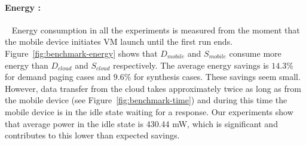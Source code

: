 \paragraph{Energy :}~
Energy consumption in all the experiments is measured from the moment
that the mobile device initiates VM launch until the first run ends.
Figure~\ref{fig:benchmark-energy} shows that $D_{mobile}$ and
$S_{mobile}$ consume more energy than $D_{cloud}$ and $S_{cloud}$
respectively. The average energy savings is $14.3\%$ for demand paging
cases and $9.6\%$ for synthesis cases. These savings seem
small. However, data transfer from the cloud takes approximately twice
as long as from the mobile device (see
Figure~\ref{fig:benchmark-time}) and during this time the mobile
device is in the idle state waiting for a response.  Our experiments
show that average power in the idle state is 430.44 mW, which is
significant and contributes to this lower than expected savings.

